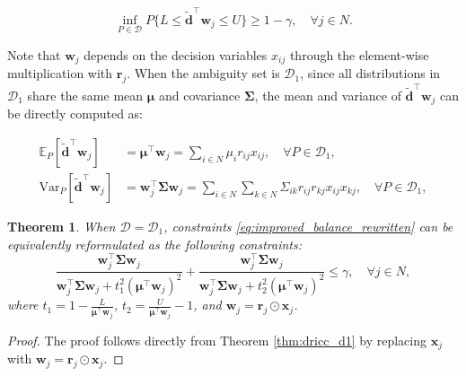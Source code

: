 \documentclass[preprint,12pt,authoryear]{elsarticle}
\newtheorem{theorem}{Theorem}
\begin{document}
\begin{equation}
\inf_{P \in \mathcal{D}} P \{L \leqslant \widetilde{\mathbf{d}}^\top \mathbf{w}_j \leqslant U \} \geqslant 1 - \gamma, \quad \forall j \in N. \label{eq:improved_balance_rewritten}
\end{equation}

Note that $\mathbf{w}_j$ depends on the decision variables $x_{ij}$ through the element-wise multiplication with $\mathbf{r}_j$. When the ambiguity set is $\mathcal{D}_1$, since all distributions in $\mathcal{D}_1$ share the same mean $\boldsymbol{\mu}$ and covariance $\boldsymbol{\Sigma}$, the mean and variance of $\widetilde{\mathbf{d}}^\top \mathbf{w}_j$ can be directly computed as:

\begin{align}
\mathbb{E}_P[\widetilde{\mathbf{d}}^\top \mathbf{w}_j] &= \boldsymbol{\mu}^\top \mathbf{w}_j = \sum_{i \in N} \mu_i r_{ij} x_{ij}, \quad \forall P \in \mathcal{D}_1, \\
\text{Var}_P[\widetilde{\mathbf{d}}^\top \mathbf{w}_j] &= \mathbf{w}_j^\top \boldsymbol{\Sigma} \mathbf{w}_j = \sum_{i \in N} \sum_{k \in N} \Sigma_{ik} r_{ij} r_{kj} x_{ij} x_{kj}, \quad \forall P \in \mathcal{D}_1,
\end{align}

\begin{theorem}\label{thm:improved_balance_d1}
When $\mathcal{D} = \mathcal{D}_1$, constraints \eqref{eq:improved_balance_rewritten} can be equivalently reformulated as the following constraints:
\begin{equation}
    \frac{\mathbf{w}_j^\top \boldsymbol{\Sigma} \mathbf{w}_j}{\mathbf{w}_j^\top \boldsymbol{\Sigma} \mathbf{w}_j + t_1^2 (\boldsymbol{\mu}^\top \mathbf{w}_j)^2} + \frac{\mathbf{w}_j^\top \boldsymbol{\Sigma} \mathbf{w}_j}{\mathbf{w}_j^\top \boldsymbol{\Sigma} \mathbf{w}_j + t_2^2 (\boldsymbol{\mu}^\top \mathbf{w}_j)^2} \leqslant \gamma, \quad \forall j \in N, \label{eq:improved_balance_d1_reform}
\end{equation}
where $t_1 = 1 - \frac{L}{\boldsymbol{\mu}^\top \mathbf{w}_j}$, $t_2 = \frac{U}{\boldsymbol{\mu}^\top \mathbf{w}_j} - 1$, and $\mathbf{w}_j = \mathbf{r}_j \odot \mathbf{x}_j$.
\end{theorem}

\begin{proof}
The proof follows directly from Theorem \ref{thm:dricc_d1} by replacing $\mathbf{x}_j$ with $\mathbf{w}_j = \mathbf{r}_j \odot \mathbf{x}_j$. 
\end{proof}
\end{document}
